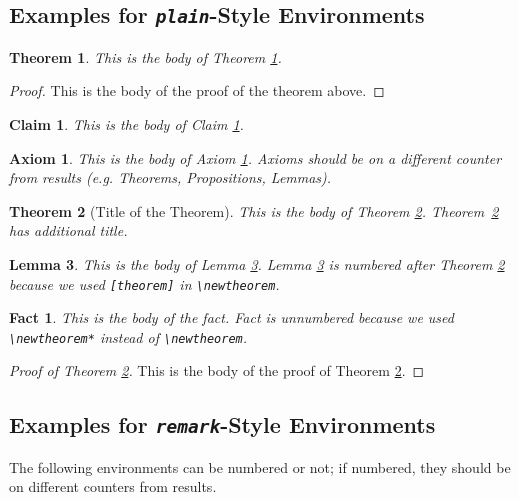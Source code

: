 \documentclass[ecta,nameyear,draft]{econsocart}
\theoremstyle{plain}
\newtheorem{axiom}{Axiom}
\newtheorem{theorem}{Theorem}
\newtheorem{claim}{Claim}
\newtheorem{lemma}[theorem]{Lemma}
\newtheorem*{fact}{Fact}
\theoremstyle{remark}
\begin{document}
\subsection{Examples for \emph{\texttt{plain}}-Style Environments}

\begin{theorem}\label{th1}
This is the body of Theorem \ref{th1}.
\end{theorem}


\begin{proof}
This is the body of the proof of the theorem above.
\end{proof}

\begin{claim}\label{cl1}
This is the body of Claim \ref{cl1}. 
\end{claim}



\begin{axiom}\label{ax1}
This is the body of Axiom \ref{ax1}. Axioms should be on a different counter from results (e.g. Theorems, Propositions, Lemmas).
\end{axiom}

\begin{theorem}[Title of the Theorem]\label{th2}
This is the body of Theorem \ref{th2}. Theorem~\ref{th2} has additional title.
\end{theorem}

\begin{lemma}\label{le1}
This is the body of Lemma \ref{le1}. Lemma \ref{le1} is numbered after
Theorem \ref{th2} because we used \verb|[theorem]| in \verb|\newtheorem|.
\end{lemma}

\begin{fact}
This is the body of the fact. Fact is unnumbered because we used \verb|\newtheorem*|
instead of \verb|\newtheorem|.
\end{fact}

\begin{proof}[Proof of Theorem \ref{th2}]
This is the body of the proof of Theorem \ref{th2}.
\end{proof}


\subsection{Examples for \emph{\texttt{remark}}-Style Environments}


The following environments can be numbered or not; if numbered, they should be on different counters from results.
\end{document}
